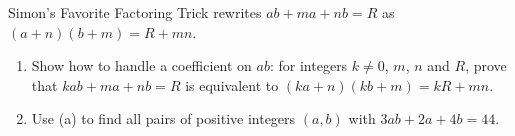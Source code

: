 Simon's Favorite Factoring Trick rewrites $ab+ma+nb=R$ as $(a+n)(b+m)=R+mn$.
\begin{enumerate}
\item[(a)] Show how to handle a coefficient on $ab$: for integers $k\ne0$, $m$, $n$ and $R$, prove that $kab+ma+nb=R$ is equivalent to $(ka+n)(kb+m)=kR+mn$.
\item[(b)] Use (a) to find all pairs of positive integers $(a,b)$ with $3ab+2a+4b=44$.
\end{enumerate}
